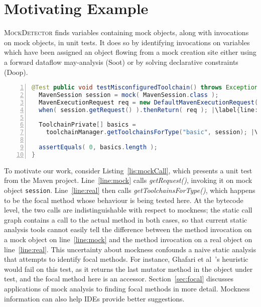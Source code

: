 \section{Motivating Example}
\label{sec:motivating-example}

\textsc{MockDetector} finds variables containing mock objects, along with invocations on mock objects, in unit tests. It does so by identifying invocations on variables which have been assigned an object flowing from a mock creation site either using a forward dataflow may-analysis (Soot) or by solving declarative constraints (Doop).

\begin{lstlisting}[basicstyle=\ttfamily, caption={Code snippet from maven-core, where calls to both the focal method \texttt{getToolchainsForType()} and to mock \texttt{session}'s \texttt{getRequest()} method occur in test \textit{testMisconfiguredToolchain()}.},
numbers=left,numbersep=2pt,basicstyle=\scriptsize\ttfamily,language = Java, framesep=4.5mm, escapechar=|,
framexleftmargin=1.0mm, captionpos=b, label=lis:mockCall, morekeywords={@Test}]
@Test public void testMisconfiguredToolchain() throws Exception {
  MavenSession session = mock( MavenSession.class );
  MavenExecutionRequest req = new DefaultMavenExecutionRequest();
  when( session.getRequest() ).thenReturn( req ); |\label{line:mock}|

  ToolchainPrivate[] basics =
    toolchainManager.getToolchainsForType("basic", session); |\label{line:real}|

  assertEquals( 0, basics.length );
}
\end{lstlisting}

To motivate our work, consider Listing~\ref{lis:mockCall}, which presents a unit test from the Maven project. Line~\ref{line:mock} calls \textit{getRequest()}, invoking it on mock object \texttt{session}. Line~\ref{line:real} then calls \textit{getToolchainsForType()}, which happens to be the focal method whose behaviour is being tested here. At the bytecode level, the two calls are indistinguishable with respect to mockness; the static call graph contains a call to the actual method in both cases, so that current static analysis tools cannot easily tell the difference between the method invocation on a mock object on line~\ref{line:mock} and the method invocation on a real object on line~\ref{line:real}. This uncertainty about mockness confounds a naive static analysis that attempts to identify focal methods. For instance, Ghafari et al~\cite{ghafari15:_autom}'s heuristic would fail on this test, as it returns the last mutator method in the object under test, and the focal method here is an accessor. Section~\ref{sec:focal} discusses applications of mock analysis to finding focal methods in more detail. Mockness information can also help IDEs provide better suggestions. 


